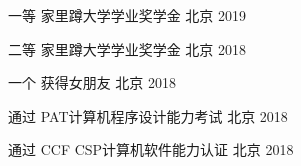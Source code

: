 



\begin{cvhonors}

  \cvhonor
    {一等} %
    {家里蹲大学学业奖学金} %
    {北京} %
    {2019} %

  \cvhonor
    {二等} %
    {家里蹲大学学业奖学金} %
    {北京} %
    {2018} %

  \cvhonor
    {一个} %
    {获得女朋友} %
    {北京} %
    {2018} %
    
    
  \cvhonor
{通过} %
{PAT计算机程序设计能力考试} %
{北京} %
{2018} %


\cvhonor
    {通过} %
    {CCF CSP计算机软件能力认证} %
    {北京} %
    {2018} %

\end{cvhonors}




